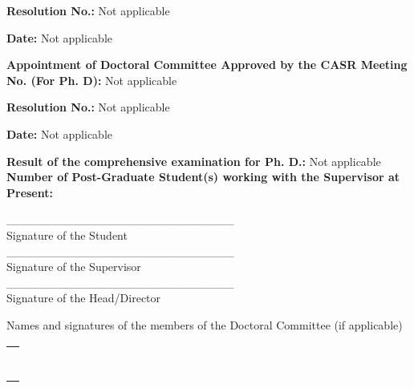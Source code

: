 \documentclass[12pt,addpoints,fleqn]{exam}
\def\arraystretch{1.5}
\newcounter{rowcount}
\begin{document}
\begin{questions}
\begin{minipage}[t]{0.45\textwidth}
\textbf{Resolution No.: }Not applicable
\end{minipage}
\begin{minipage}[t]{0.45\textwidth}
\textbf{Date:} Not applicable
\end{minipage}
{\bfseries \question
\textbf{Appointment of Doctoral Committee Approved by the CASR Meeting No. (For Ph. D):}} Not applicable\\
\begin{minipage}[t]{0.45\textwidth}
\textbf{Resolution No.: }Not applicable
\end{minipage}
\begin{minipage}[t]{0.45\textwidth}
\textbf{Date:} Not applicable
\end{minipage}
{\bfseries \question
\textbf{Result of the comprehensive examination for Ph. D.:}} Not applicable
{\bfseries \question
\textbf{Number of Post-Graduate Student(s) working with the Supervisor at Present:}}\\
\begin{minipage}[t]{0.4\textwidth}
\flushleft
\vspace{3cm}
\_\_\_\_\_\_\_\_\_\_\_\_\_\_\_\_\_\_\_\_\_\_\_\_\_\_\_\\
Signature of the Student\\
\vspace{3cm}
\_\_\_\_\_\_\_\_\_\_\_\_\_\_\_\_\_\_\_\_\_\_\_\_\_\_\_\\
Signature of the Supervisor\\
\vspace{3cm}
\_\_\_\_\_\_\_\_\_\_\_\_\_\_\_\_\_\_\_\_\_\_\_\_\_\_\_\\
Signature of the Head/Director\\
\end{minipage}
\begin{minipage}[t]{0.5\textwidth}
\flushleft\vspace{1cm}
{\begin{center} Names and signatures of the members of the Doctoral Committee (if applicable) \end{center}}
\begin{center}
\def\arraystretch{2.25}
\begin{tabular}{|@{\stepcounter{rowcount}\makebox[2em][c]{\therowcount.}}|p{}|}
\hline
\\
\hline
\\
\hline
\\
\hline
\\
\hline
\\
\hline
\\
\hline
\\
\hline
\\
\hline
\end{tabular}
\end{center}
\end{minipage}
\end{questions}
\end{document}

